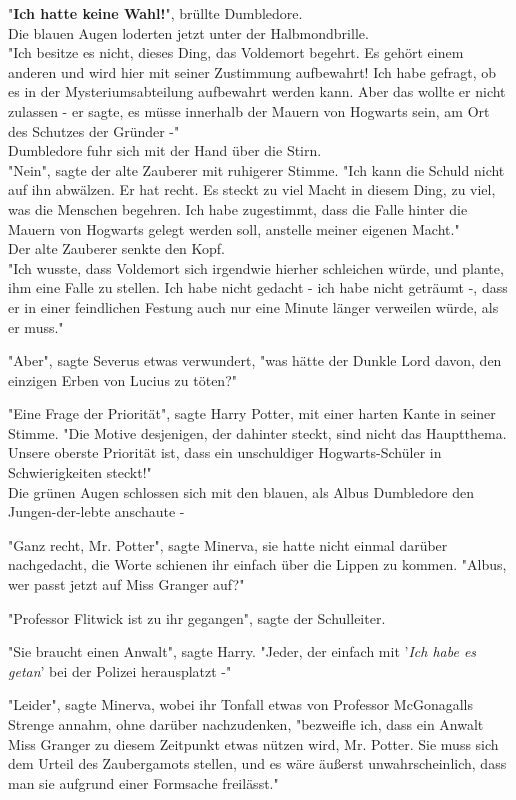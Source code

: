 {"\textbf{Ich hatte keine Wahl!}", brüllte Dumbledore.\\ Die blauen Augen loderten jetzt unter der Halbmondbrille.\\ "Ich besitze es nicht, dieses Ding, das Voldemort begehrt. Es gehört einem anderen und wird hier mit seiner Zustimmung aufbewahrt! Ich habe gefragt, ob es in der Mysteriumsabteilung aufbewahrt werden kann. Aber das wollte er nicht zulassen - er sagte, es müsse innerhalb der Mauern von Hogwarts sein, am Ort des Schutzes der Gründer -"\\ Dumbledore fuhr sich mit der Hand über die Stirn.\\ "Nein", sagte der alte Zauberer mit ruhigerer Stimme. "Ich kann die Schuld nicht auf ihn abwälzen. Er hat recht. Es steckt zu viel Macht in diesem Ding, zu viel, was die Menschen begehren. Ich habe zugestimmt, dass die Falle hinter die Mauern von Hogwarts gelegt werden soll, anstelle meiner eigenen Macht."\\ Der alte Zauberer senkte den Kopf.\\ "Ich wusste, dass Voldemort sich irgendwie hierher schleichen würde, und plante, ihm eine Falle zu stellen. Ich habe nicht gedacht - ich habe nicht geträumt -, dass er in einer feindlichen Festung auch nur eine Minute länger verweilen würde, als er muss."

"Aber", sagte Severus etwas verwundert, "was hätte der Dunkle Lord davon, den einzigen Erben von Lucius zu töten?"

"Eine Frage der Priorität", sagte Harry Potter, mit einer harten Kante in seiner Stimme. "Die Motive desjenigen, der dahinter steckt, sind nicht das Hauptthema. Unsere oberste Priorität ist, dass ein unschuldiger Hogwarts-Schüler in Schwierigkeiten steckt!"\\ Die grünen Augen schlossen sich mit den blauen, als Albus Dumbledore den Jungen-der-lebte anschaute -

"Ganz recht, Mr. Potter", sagte Minerva, sie hatte nicht einmal darüber nachgedacht, die Worte schienen ihr einfach über die Lippen zu kommen. "Albus, wer passt jetzt auf Miss Granger auf?"

"Professor Flitwick ist zu ihr gegangen", sagte der Schulleiter.

"Sie braucht einen Anwalt", sagte Harry. "Jeder, der einfach mit '\emph{Ich habe es getan}' bei der Polizei herausplatzt -"

"Leider", sagte Minerva, wobei ihr Tonfall etwas von Professor McGonagalls Strenge annahm, ohne darüber nachzudenken, "bezweifle ich, dass ein Anwalt Miss Granger zu diesem Zeitpunkt etwas nützen wird, Mr. Potter. Sie muss sich dem Urteil des Zaubergamots stellen, und es wäre äußerst unwahrscheinlich, dass man sie aufgrund einer Formsache freilässt."

}
